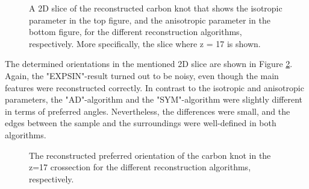 \begin{figure}[h!]
    \centering
    
    
    \caption{  A 2D slice of the reconstructed carbon knot that shows the isotropic parameter in the top figure, and the anisotropic parameter in the bottom figure, for the different reconstruction algorithms, respectively.
        More specifically, the slice where z = 17 is shown. }
    \label{fig:carbon_knot_reconstruction_2D_coeffs}
\end{figure}

\clearpage
The determined orientations in the mentioned 2D slice are shown in Figure \ref{fig:carbon_knot_reconstruction_2D_angles}. %
Again, the "EXPSIN"-result turned out to be noisy, even though the main features were reconstructed correctly.
In contrast to the isotropic and anisotropic parameters,
the "AD"-algorithm and the "SYM"-algorithm were slightly different in terms of preferred angles.
Nevertheless, the differences were small, and the edges between the sample and the surroundings were well-defined in both algorithms.

\begin{figure}[h!]
    \centering
    
    
    \caption{  The reconstructed preferred orientation of the carbon knot in the z=17 crossection for the different reconstruction algorithms, respectively. }
    \label{fig:carbon_knot_reconstruction_2D_angles}
\end{figure}




